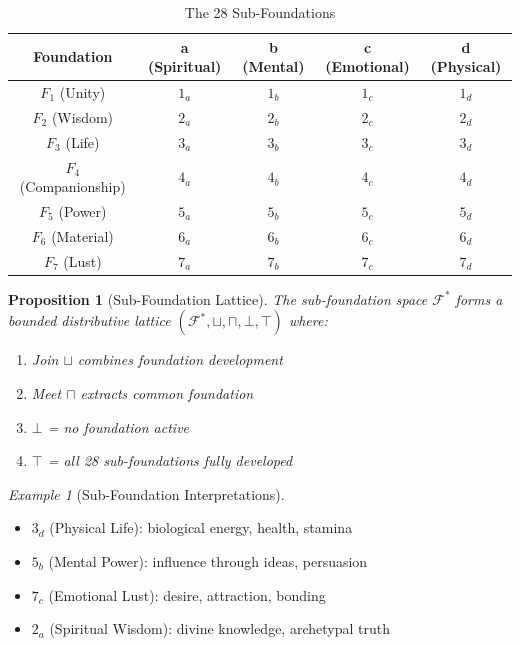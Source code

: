 \documentclass[11pt,twoside,openright]{book}
\theoremstyle{definition}
\theoremstyle{plain}
\newtheorem{proposition}[definition]{Proposition}
\theoremstyle{remark}
\newtheorem{example}[definition]{Example}
\newcommand{\Foundations}{\mathcal{F}}
\begin{document}
\begin{table}[ht]
\centering
\caption{The 28 Sub-Foundations}
\label{tab:28-subfoundations}
\begin{tabular}{c|cccc}
\toprule
\textbf{Foundation} & \textbf{a (Spiritual)} & \textbf{b (Mental)} & \textbf{c (Emotional)} & \textbf{d (Physical)} \\
\midrule
$F_1$ (Unity) & $1_a$ & $1_b$ & $1_c$ & $1_d$ \\
$F_2$ (Wisdom) & $2_a$ & $2_b$ & $2_c$ & $2_d$ \\
$F_3$ (Life) & $3_a$ & $3_b$ & $3_c$ & $3_d$ \\
$F_4$ (Companionship) & $4_a$ & $4_b$ & $4_c$ & $4_d$ \\
$F_5$ (Power) & $5_a$ & $5_b$ & $5_c$ & $5_d$ \\
$F_6$ (Material) & $6_a$ & $6_b$ & $6_c$ & $6_d$ \\
$F_7$ (Lust) & $7_a$ & $7_b$ & $7_c$ & $7_d$ \\
\bottomrule
\end{tabular}
\end{table}

\begin{proposition}[Sub-Foundation Lattice]
\label{prop:subfoundation-lattice}
The sub-foundation space $\Foundations^*$ forms a bounded distributive lattice $(\Foundations^*, \sqcup, \sqcap, \bot, \top)$ where:
\begin{enumerate}[label=(\roman*)]
  \item Join $\sqcup$ combines foundation development
  \item Meet $\sqcap$ extracts common foundation
  \item $\bot$ = no foundation active
  \item $\top$ = all 28 sub-foundations fully developed
\end{enumerate}
\end{proposition}

\begin{example}[Sub-Foundation Interpretations]
\label{ex:subfoundation-interpretations}
\begin{itemize}
  \item $3_d$ (Physical Life): biological energy, health, stamina
  \item $5_b$ (Mental Power): influence through ideas, persuasion
  \item $7_c$ (Emotional Lust): desire, attraction, bonding
  \item $2_a$ (Spiritual Wisdom): divine knowledge, archetypal truth
\end{itemize}
\end{example}
\end{document}

